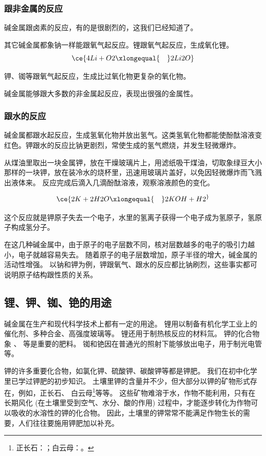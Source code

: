 \subsubsection{跟非金属的反应}
碱金属跟卤素的反应，有的是很剧烈的，这我们已经知道了。

其它碱金属都象钠一样能跟氧气起反应。锂跟氧气起反应，生成氧化锂。
\[ \ce{ 4Li + O2 \xlongequal{\quad} 2 Li2O} \]

钾、铷等跟氧气起反应，生成比过氧化物更复杂的氧化物。

碱金属能够跟大多数的非金属起反应，表现出很强的金属性。

\subsubsection{跟水的反应}
碱金属都跟水起反应，生成氢氧化物并放出氢气。这类氢氧化物都能使酚酞溶液变红色。钾跟水的反应比钠更剧烈，常使生成的氢气燃烧，并发生轻微爆炸。
\begin{Experiment}
从煤油里取出一块金属钾，放在干燥玻璃片上，用滤纸吸干煤油，切取象绿豆大小那样的一块钾，放在装冷水的烧杯里，迅速用玻璃片盖好，以免因轻微爆炸而飞溅出液体来。
反应完成后滴入几滴酚酞溶液，观察溶液颜色的变化。
\end{Experiment}

\[ \ce{2K + 2H2O \xlongequal{\quad} 2KOH + H2 ^} \]

这个反应就是钾原子失去一个电子，水里的氢离子获得一个电子成为氢原子，氢原子构成氢分子。

在这几种碱金属中，由于原子的电子层数不同，核对层数越多的电子的吸引力越小，电子就越容易失去。
随着原子的电子层数增加，原子半径的增大，碱金属的活动性增强。
以钠和钾为例，钾跟氧气、跟水的反应都比钠刷烈，这些事实都可说明原子结构跟性质的关系。

\subsection{锂、钾、铷、铯的用途}
碱金属在生产和现代科学技术上都有一定的用途。
锂用以制备有机化学工业上的催化剂、多种合金、高强度玻璃等。
锂还用于制热核反应的材料氚。
钾的化合物象 、 等是重要的肥料。
铷和铯因在普通光的照射下能够放出电子，用于制光电管等。

钾的许多重要化合物，如氯化钾、硫酸钾、碳酸钾等都是钾肥。
我们在初中化学里已学过钾肥的初步知识。
土壤里钾的含量并不少，但大部分以钾的矿物形式存在，例如，正长石、 白云母\footnote{正长石：；白云母：。}等等。
这些矿物难溶于水，作物不能利用，只有在长期风化 (在土壤里受到空气、水分、酸的作用) 过程中，才能逐步转化为作物可以吸收的水溶性的钾的化合物。
因此，土壤里的钾常常不能满足作物生长的需要，人们往往要施用钾肥加以补充。


